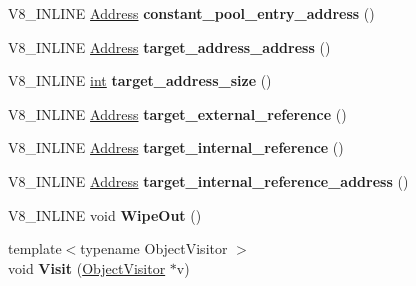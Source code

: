 \begin{DoxyCompactItemize}
\item 
\mbox{\label{classv8_1_1internal_1_1RelocInfo_abecc351ac3cac56e2f2c19081b2fc2e1}} 
V8\+\_\+\+I\+N\+L\+I\+NE \mbox{\hyperlink{classuintptr__t}{Address}} {\bfseries constant\+\_\+pool\+\_\+entry\+\_\+address} ()
\item 
\mbox{\label{classv8_1_1internal_1_1RelocInfo_ae31c8ab764a827e3319303f8aa937863}} 
V8\+\_\+\+I\+N\+L\+I\+NE \mbox{\hyperlink{classuintptr__t}{Address}} {\bfseries target\+\_\+address\+\_\+address} ()
\item 
\mbox{\label{classv8_1_1internal_1_1RelocInfo_a830e369f0e5f6c22a6427ce90637dd4c}} 
V8\+\_\+\+I\+N\+L\+I\+NE \mbox{\hyperlink{classint}{int}} {\bfseries target\+\_\+address\+\_\+size} ()
\item 
\mbox{\label{classv8_1_1internal_1_1RelocInfo_aa3014108f63ba702145573e65c2da262}} 
V8\+\_\+\+I\+N\+L\+I\+NE \mbox{\hyperlink{classuintptr__t}{Address}} {\bfseries target\+\_\+external\+\_\+reference} ()
\item 
\mbox{\label{classv8_1_1internal_1_1RelocInfo_a06b1200cd7ebba343854d0a5ab49434d}} 
V8\+\_\+\+I\+N\+L\+I\+NE \mbox{\hyperlink{classuintptr__t}{Address}} {\bfseries target\+\_\+internal\+\_\+reference} ()
\item 
\mbox{\label{classv8_1_1internal_1_1RelocInfo_a6ad4cf43111402992637884496a0f2c3}} 
V8\+\_\+\+I\+N\+L\+I\+NE \mbox{\hyperlink{classuintptr__t}{Address}} {\bfseries target\+\_\+internal\+\_\+reference\+\_\+address} ()
\item 
\mbox{\label{classv8_1_1internal_1_1RelocInfo_af71beb53464ee31d4f5077fa15abc8ca}} 
V8\+\_\+\+I\+N\+L\+I\+NE void {\bfseries Wipe\+Out} ()
\item 
\mbox{\label{classv8_1_1internal_1_1RelocInfo_abfce7f28cc216eef8d89a1450aa85b5e}} 
{\footnotesize template$<$typename Object\+Visitor $>$ }\\void {\bfseries Visit} (\mbox{\hyperlink{classv8_1_1internal_1_1ObjectVisitor}{Object\+Visitor}} $\ast$v)
\end{DoxyCompactItemize}

